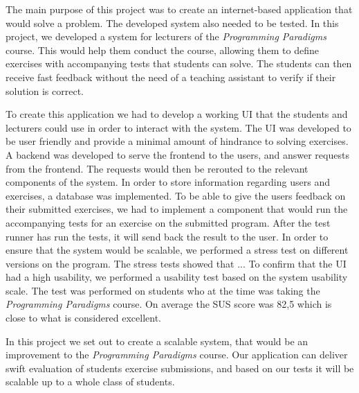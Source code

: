 The main purpose of this project was to create an internet-based application that would solve a problem. The developed system also needed to be tested. 
In this project, we developed a system for lecturers of the \textit{Programming Paradigms} course. 
This would help them conduct the course, allowing them to define exercises with accompanying tests that students can solve. 
The students can then receive fast feedback without the need of a teaching assistant to verify if their solution is correct. 

To create this application we had to develop a working UI that the students and lecturers could use in order to interact with the system. The UI was developed to be user friendly and provide a minimal amount of hindrance to solving exercises.
A backend was developed to serve the frontend to the users, and answer requests from the frontend. 
The requests would then be rerouted to the relevant components of the system. 
In order to store information regarding users and exercises, a database was implemented.
To be able to give the users feedback on their submitted exercises, we had to implement a component that would run the accompanying tests for an exercise on the submitted program. 
After the test runner has run the tests, it will send back the result to the user.
In order to ensure that the system would be scalable, we performed a stress test on different versions on the program. 
The stress tests showed that ... 
To confirm that the UI had a high usability, we performed a usability test based on the system usability scale.
The test was performed on students who at the time was taking the \textit{Programming Paradigms} course.
On average the SUS score was 82,5 which is close to what is considered excellent.  

In this project we set out to create a scalable system, that would be an improvement to the \textit{Programming Paradigms} course.
Our application can deliver swift evaluation of students exercise submissions, and based on our tests it will be scalable up to a whole class of students.